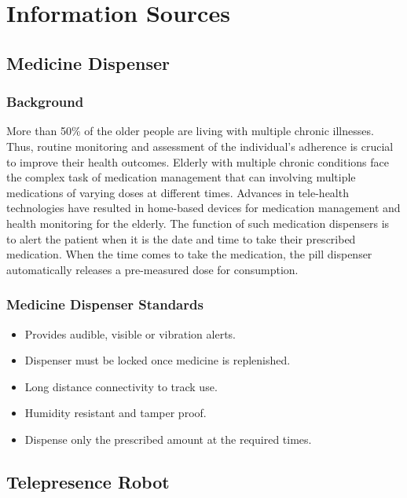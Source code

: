 \documentclass[12pt]{article}
\begin{document}
\section{Information Sources}
\subsection{Medicine Dispenser}
\subsubsection{Background}
More than 50\% of the older people are living with multiple chronic illnesses\cite{2}. Thus, routine monitoring and assessment of the individual’s adherence is crucial to improve their health outcomes. Elderly with multiple chronic conditions face the complex task of medication management that can involving multiple medications of varying doses at different times. Advances in tele-health technologies have resulted in home-based devices for medication management and health monitoring for the elderly\cite{3}. The function of such medication dispensers is to alert the patient when it is the date and time to take their prescribed medication\cite{4}. When the time comes to take the medication, the pill dispenser automatically releases a pre-measured dose for consumption.
\subsubsection{Medicine Dispenser Standards\cite{5}}
\begin{itemize}
    \item Provides audible, visible or vibration alerts.
    \item Dispenser must be locked once medicine is replenished.
    \item Long distance connectivity to track use.
    \item Humidity resistant and tamper proof.
    \item Dispense only the prescribed amount at the required times.
\end{itemize}
\subsection{Telepresence Robot}
\end{document}
